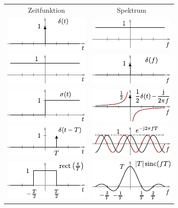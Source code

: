 \documentclass[fs, footer]{latex4ei}
\begin{document}
\begin{multicols*}{4}
{	\begin{tabular*}{\columnwidth}{c@{\extracolsep\fill}c}
		\large Zeitfunktion & \large Spektrum\\ \mrule
		\includegraphics{./img/FT/dirac_t.pdf} & \includegraphics{./img/FT/dirac_f.pdf}\\[1em]
		\includegraphics{./img/FT/1_t.pdf} & \includegraphics{./img/FT/1_f.pdf}\\[1em]
		\includegraphics{./img/FT/sigma_t.pdf} & \includegraphics{./img/FT/sigma_f.pdf}\\[1em]
		\includegraphics{./img/FT/verschiebung_t.pdf} & \includegraphics{./img/FT/verschiebung_f.pdf}\\[1em]
		\includegraphics{./img/FT/rect_t.pdf} &  \includegraphics{./img/FT/rect_f.pdf}\\[1em]

\end{tabular*}}
\end{multicols*}
\end{document}
